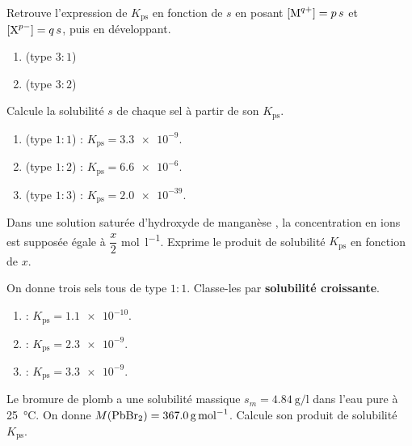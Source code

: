 \documentclass[11pt,a4paper]{article}
\begin{document}
\begin{exo}
Retrouve l'expression de $K_{\mathrm{ps}}$ en fonction de $s$ en posant $[\ce{M^{q+}}]=p\,s$ et
$[\ce{X^{p-}}]=q\,s$, puis en développant.
\begin{enumerate}[label=\alph*)]
  \item {} (type $3{:}1$)
  \item {} (type $3{:}2$)
\end{enumerate}
\end{exo}

\begin{exo}
Calcule la solubilité $s$ de chaque sel à partir de son $K_{\mathrm{ps}}$.
\begin{enumerate}[label=\alph*)]
  \item {} (type $1{:}1$) : $K_{\mathrm{ps}}=\num{3.3e-9}$.
  \item {} (type $1{:}2$) : $K_{\mathrm{ps}}=\num{6.6e-6}$.
  \item {} (type $1{:}3$) : $K_{\mathrm{ps}}=\num{2.0e-39}$.
\end{enumerate}
\end{exo}

\begin{exo}
Dans une solution saturée d'hydroxyde de manganèse , la concentration en ions
 est supposée égale à $\dfrac{x}{2}$ \si{\mole\per\litre}. Exprime le produit de solubilité
$K_{\mathrm{ps}}$ en fonction de $x$.
\end{exo}

\begin{exo}
On donne trois sels tous de type $1{:}1$. Classe-les par \textbf{solubilité croissante}.
\begin{enumerate}[label=\alph*)]
  \item {} : $K_{\mathrm{ps}}=\num{1.1e-10}$.
  \item {} : $K_{\mathrm{ps}}=\num{2.3e-9}$.
  \item {} : $K_{\mathrm{ps}}=\num{3.3e-9}$.
\end{enumerate}
\end{exo}

\begin{exo}
Le bromure de plomb  a une solubilité massique $s_m=\qty{4.84}{\gram\per\litre}$ dans l'eau
pure à \qty{25}{\degreeCelsius}. On donne $M(\ce{PbBr2})=\qty{367.0}{\gram\per\mole}$. Calcule son
produit de solubilité $K_{\mathrm{ps}}$.
\end{exo}
\end{document}
